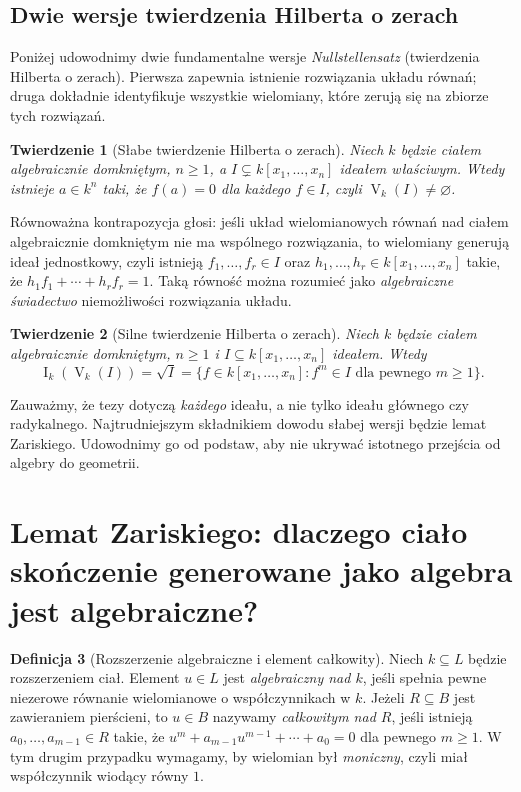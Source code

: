 \documentclass[11pt,a4paper,openany]{report}
\numberwithin{equation}{section}
\theoremstyle{plain}
\newtheorem{twierdzenie}{Twierdzenie}[section]
\theoremstyle{definition}
\newtheorem{definicja}[twierdzenie]{Definicja}
\theoremstyle{remark}
\newcommand{\V}{\operatorname V}
\newcommand{\I}{\operatorname I}
\begin{document}
\subsection{Dwie wersje twierdzenia Hilberta o zerach}

Poniżej udowodnimy dwie fundamentalne wersje
\emph{Nullstellensatz} (twierdzenia Hilberta o zerach).
Pierwsza zapewnia istnienie rozwiązania układu równań;
druga dokładnie identyfikuje wszystkie wielomiany, które
zerują się na zbiorze tych rozwiązań.

\begin{twierdzenie}[Słabe twierdzenie Hilberta o zerach]
\label{tw:weak-NS}
Niech $k$ będzie ciałem algebraicznie domkniętym,
$n\ge1$, a $I\subsetneq k[x_1,\dots,x_n]$ ideałem właściwym.
Wtedy istnieje $a\in k^n$ taki, że $f(a)=0$ dla każdego $f\in I$,
czyli $\V_k(I)\ne\varnothing$.
\end{twierdzenie}

Równoważna kontrapozycja głosi: jeśli układ wielomianowych
równań nad ciałem algebraicznie domkniętym nie ma wspólnego
rozwiązania, to wielomiany generują ideał jednostkowy, czyli
istnieją $f_1,\dots,f_r\in I$ oraz
$h_1,\dots,h_r\in k[x_1,\dots,x_n]$ takie, że
$h_1f_1+\cdots+h_rf_r=1$.
Taką równość można rozumieć jako \emph{algebraiczne świadectwo}
niemożliwości rozwiązania układu.

\begin{twierdzenie}[Silne twierdzenie Hilberta o zerach]
\label{tw:strong-NS}
Niech $k$ będzie ciałem algebraicznie domkniętym,
$n\ge1$ i $I\subseteq k[x_1,\dots,x_n]$ ideałem.
Wtedy
\[
\I_k(\V_k(I))=\sqrt I
=\{f\in k[x_1,\dots,x_n]:f^m\in I\text{ dla pewnego }m\ge1\}.
\]
\end{twierdzenie}

Zauważmy, że tezy dotyczą \emph{każdego} ideału,
a nie tylko ideału głównego czy radykalnego. Najtrudniejszym
składnikiem dowodu słabej wersji będzie lemat Zariskiego.
Udowodnimy go od podstaw, aby nie ukrywać istotnego przejścia
od algebry do geometrii.

\section{Lemat Zariskiego: dlaczego ciało skończenie generowane jako algebra jest algebraiczne?}

\begin{definicja}[Rozszerzenie algebraiczne i element całkowity]
Niech $k\subseteq L$ będzie rozszerzeniem ciał. Element $u\in L$
jest \emph{algebraiczny nad $k$}, jeśli spełnia pewne niezerowe
równanie wielomianowe o współczynnikach w $k$.
Jeżeli $R\subseteq B$ jest zawieraniem pierścieni, to $u\in B$
nazywamy \emph{całkowitym nad $R$}, jeśli istnieją
$a_0,\dots,a_{m-1}\in R$ takie, że
$u^m+a_{m-1}u^{m-1}+\cdots+a_0=0$ dla pewnego $m\ge1$.
W tym drugim przypadku wymagamy, by wielomian był \emph{moniczny},
czyli miał współczynnik wiodący równy $1$.
\end{definicja}
\end{document}
